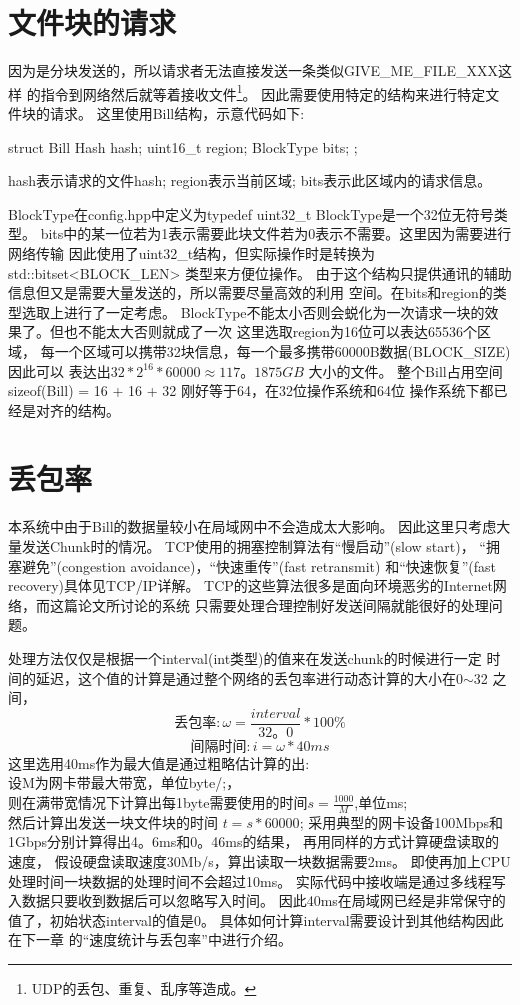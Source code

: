 \section{文件块的请求}
因为是分块发送的，所以请求者无法直接发送一条类似GIVE\_ME\_FILE\_XXX这样
的指令到网络然后就等着接收文件\footnote{UDP的丢包、重复、乱序等造成。}。
因此需要使用特定的结构来进行特定文件块的请求。
这里使用Bill结构，示意代码如下:
\begin{cppcode}
struct Bill {
  Hash hash;
  uint16_t region;
  BlockType bits;
};
\end{cppcode}
hash表示请求的文件hash;
region表示当前区域;
bits表示此区域内的请求信息。

BlockType在config.hpp中定义为typedef uint32\_t BlockType是一个32位无符号类型。
bits中的某一位若为1表示需要此块文件若为0表示不需要。这里因为需要进行网络传输
因此使用了uint32\_t结构，但实际操作时是转换为std::bitset<\mbox{BLOCK\_LEN}>
类型来方便位操作。
由于这个结构只提供通讯的辅助信息但又是需要大量发送的，所以需要尽量高效的利用
空间。在bits和region的类型选取上进行了一定考虑。
BlockType不能太小否则会蜕化为一次请求一块的效果了。但也不能太大否则就成了一次
这里选取region为16位可以表达65536个区域，
每一个区域可以携带32块信息，每一个最多携带60000B数据(BLOCK\_SIZE)因此可以
表达出$32 * 2^{16} * 60000 \approx 117。1875GB$ 大小的文件。
整个Bill占用空间sizeof(Bill) = 16 + 16 + 32 刚好等于64，在32位操作系统和64位
操作系统下都已经是对齐的结构。

\section{丢包率}
本系统中由于Bill的数据量较小在局域网中不会造成太大影响。
因此这里只考虑大量发送Chunk时的情况。
TCP使用的拥塞控制算法\cite{TCP}有``慢启动''(slow start)，
``拥塞避免''(congestion avoidance)，``快速重传''(fast retransmit)
和``快速恢复''(fast recovery)具体见TCP/IP详解\cite{TCP/IP}。
TCP的这些算法很多是面向环境恶劣的Internet网络，而这篇论文所讨论的系统
只需要处理合理控制好发送间隔就能很好的处理问题。

处理方法仅仅是根据一个interval(int类型)的值来在发送chunk的时候进行一定
时间的延迟，这个值的计算是通过整个网络的丢包率进行动态计算的大小在0$\sim$32
之间，
\[\textrm{丢包率}:\omega = \frac{interval}{32。0} * 100\%\]
\[\textrm{间隔时间}:i = \omega * 40ms\]
这里选用40ms作为最大值是通过粗略估计算的出:\\
设M为网卡带最大带宽，单位byte/;，\\
则在满带宽情况下计算出每1byte需要使用的时间$s = \frac{1000}{M}$,单位ms;\\
然后计算出发送一块文件块的时间 $t = s * 60000$;
采用典型的网卡设备100Mbps和1Gbps分别计算得出4。6ms和0。46ms的结果，
再用同样的方式计算硬盘读取的速度，
假设硬盘读取速度30Mb/s，算出读取一块数据需要2ms。
即使再加上CPU处理时间一块数据的处理时间不会超过10ms。
实际代码中接收端是通过多线程写入数据只要收到数据后可以忽略写入时间。
因此40ms在局域网已经是非常保守的值了，初始状态interval的值是0。
具体如何计算interval需要设计到其他结构因此在下一章
的``速度统计与丢包率''中进行介绍。
